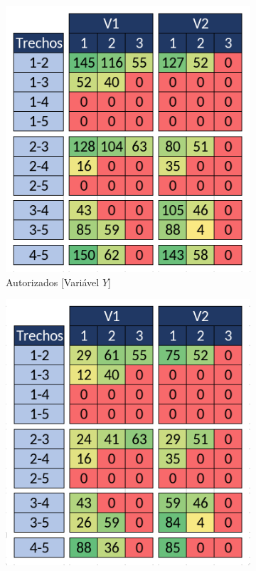 \begin{figure}[H]
	\centering
	\begin{subfigure}[b]{0.35\linewidth}
		\includegraphics[width=\linewidth]{img/exemplo1.png}
		\caption{Autorizados [Variável $Y$]}
		\label{fig:auto_assig_a}
	\end{subfigure}\hspace{5mm}
	\begin{subfigure}[b]{0.35\linewidth}
		\includegraphics[width=\linewidth]{img/exemplo2.png}

\end{subfigure}
\end{figure}
